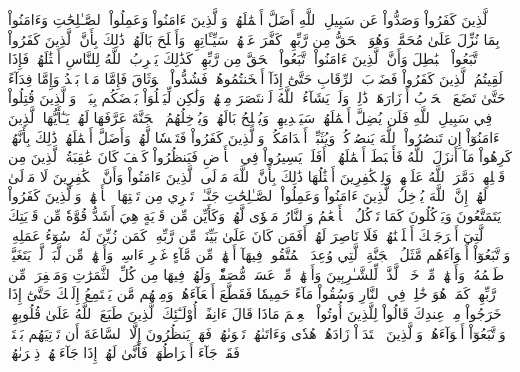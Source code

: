 ٱلَّذِينَ كَفَرُواْ وَصَدُّواْ عَن سَبِيلِ ٱللَّهِ أَضَلَّ أَعۡمَٰلَهُمۡ
وَٱلَّذِينَ ءَامَنُواْ وَعَمِلُواْ ٱلصَّـٰلِحَٰتِ وَءَامَنُواْ بِمَا نُزِّلَ عَلَىٰ مُحَمَّدٖ وَهُوَ ٱلۡحَقُّ مِن رَّبِّهِمۡ كَفَّرَ عَنۡهُمۡ سَيِّـَٔاتِهِمۡ وَأَصۡلَحَ بَالَهُمۡ
ذَٰلِكَ بِأَنَّ ٱلَّذِينَ كَفَرُواْ ٱتَّبَعُواْ ٱلۡبَٰطِلَ وَأَنَّ ٱلَّذِينَ ءَامَنُواْ ٱتَّبَعُواْ ٱلۡحَقَّ مِن رَّبِّهِمۡۚ كَذَٰلِكَ يَضۡرِبُ ٱللَّهُ لِلنَّاسِ أَمۡثَٰلَهُمۡ
فَإِذَا لَقِيتُمُ ٱلَّذِينَ كَفَرُواْ فَضَرۡبَ ٱلرِّقَابِ حَتَّىٰٓ إِذَآ أَثۡخَنتُمُوهُمۡ فَشُدُّواْ ٱلۡوَثَاقَ فَإِمَّا مَنَّۢا بَعۡدُ وَإِمَّا فِدَآءً حَتَّىٰ تَضَعَ ٱلۡحَرۡبُ أَوۡزَارَهَاۚ ذَٰلِكَۖ وَلَوۡ يَشَآءُ ٱللَّهُ لَٱنتَصَرَ مِنۡهُمۡ وَلَٰكِن لِّيَبۡلُوَاْ بَعۡضَكُم بِبَعۡضٖۗ وَٱلَّذِينَ قُتِلُواْ فِي سَبِيلِ ٱللَّهِ فَلَن يُضِلَّ أَعۡمَٰلَهُمۡ
سَيَهۡدِيهِمۡ وَيُصۡلِحُ بَالَهُمۡ
وَيُدۡخِلُهُمُ ٱلۡجَنَّةَ عَرَّفَهَا لَهُمۡ
يَـٰٓأَيُّهَا ٱلَّذِينَ ءَامَنُوٓاْ إِن تَنصُرُواْ ٱللَّهَ يَنصُرۡكُمۡ وَيُثَبِّتۡ أَقۡدَامَكُمۡ
وَٱلَّذِينَ كَفَرُواْ فَتَعۡسٗا لَّهُمۡ وَأَضَلَّ أَعۡمَٰلَهُمۡ
ذَٰلِكَ بِأَنَّهُمۡ كَرِهُواْ مَآ أَنزَلَ ٱللَّهُ فَأَحۡبَطَ أَعۡمَٰلَهُمۡ
۞أَفَلَمۡ يَسِيرُواْ فِي ٱلۡأَرۡضِ فَيَنظُرُواْ كَيۡفَ كَانَ عَٰقِبَةُ ٱلَّذِينَ مِن قَبۡلِهِمۡۖ دَمَّرَ ٱللَّهُ عَلَيۡهِمۡۖ وَلِلۡكَٰفِرِينَ أَمۡثَٰلُهَا
ذَٰلِكَ بِأَنَّ ٱللَّهَ مَوۡلَى ٱلَّذِينَ ءَامَنُواْ وَأَنَّ ٱلۡكَٰفِرِينَ لَا مَوۡلَىٰ لَهُمۡ
إِنَّ ٱللَّهَ يُدۡخِلُ ٱلَّذِينَ ءَامَنُواْ وَعَمِلُواْ ٱلصَّـٰلِحَٰتِ جَنَّـٰتٖ تَجۡرِي مِن تَحۡتِهَا ٱلۡأَنۡهَٰرُۖ وَٱلَّذِينَ كَفَرُواْ يَتَمَتَّعُونَ وَيَأۡكُلُونَ كَمَا تَأۡكُلُ ٱلۡأَنۡعَٰمُ وَٱلنَّارُ مَثۡوٗى لَّهُمۡ
وَكَأَيِّن مِّن قَرۡيَةٍ هِيَ أَشَدُّ قُوَّةٗ مِّن قَرۡيَتِكَ ٱلَّتِيٓ أَخۡرَجَتۡكَ أَهۡلَكۡنَٰهُمۡ فَلَا نَاصِرَ لَهُمۡ
أَفَمَن كَانَ عَلَىٰ بَيِّنَةٖ مِّن رَّبِّهِۦ كَمَن زُيِّنَ لَهُۥ سُوٓءُ عَمَلِهِۦ وَٱتَّبَعُوٓاْ أَهۡوَآءَهُم
مَّثَلُ ٱلۡجَنَّةِ ٱلَّتِي وُعِدَ ٱلۡمُتَّقُونَۖ فِيهَآ أَنۡهَٰرٞ مِّن مَّآءٍ غَيۡرِ ءَاسِنٖ وَأَنۡهَٰرٞ مِّن لَّبَنٖ لَّمۡ يَتَغَيَّرۡ طَعۡمُهُۥ وَأَنۡهَٰرٞ مِّنۡ خَمۡرٖ لَّذَّةٖ لِّلشَّـٰرِبِينَ وَأَنۡهَٰرٞ مِّنۡ عَسَلٖ مُّصَفّٗىۖ وَلَهُمۡ فِيهَا مِن كُلِّ ٱلثَّمَرَٰتِ وَمَغۡفِرَةٞ مِّن رَّبِّهِمۡۖ كَمَنۡ هُوَ خَٰلِدٞ فِي ٱلنَّارِ وَسُقُواْ مَآءً حَمِيمٗا فَقَطَّعَ أَمۡعَآءَهُمۡ
وَمِنۡهُم مَّن يَسۡتَمِعُ إِلَيۡكَ حَتَّىٰٓ إِذَا خَرَجُواْ مِنۡ عِندِكَ قَالُواْ لِلَّذِينَ أُوتُواْ ٱلۡعِلۡمَ مَاذَا قَالَ ءَانِفًاۚ أُوْلَـٰٓئِكَ ٱلَّذِينَ طَبَعَ ٱللَّهُ عَلَىٰ قُلُوبِهِمۡ وَٱتَّبَعُوٓاْ أَهۡوَآءَهُمۡ
وَٱلَّذِينَ ٱهۡتَدَوۡاْ زَادَهُمۡ هُدٗى وَءَاتَىٰهُمۡ تَقۡوَىٰهُمۡ
فَهَلۡ يَنظُرُونَ إِلَّا ٱلسَّاعَةَ أَن تَأۡتِيَهُم بَغۡتَةٗۖ فَقَدۡ جَآءَ أَشۡرَاطُهَاۚ فَأَنَّىٰ لَهُمۡ إِذَا جَآءَتۡهُمۡ ذِكۡرَىٰهُمۡ
